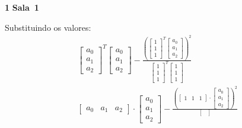 \documentclass{article}
\newcounter{exe-list}
\newenvironment{exe}[2][Sala]
    {\bigskip\noindent\par\ifthenelse{\equal{#1}{}}%
        {\textbf{\LARGE #2}}%
        {\textbf{\LARGE #1~#2}}%
    \medskip\noindent\par}
    {\bigskip}
\begin{document}
\begin{exe}{1}
    Substituindo os valores:
    \begin{align*}
        &\begin{bmatrix}
                a_0 \\ a_1 \\ a_2
            \end{bmatrix}^T \begin{bmatrix}
                a_0 \\ a_1 \\ a_2
            \end{bmatrix}
            - \frac{
                \left(\begin{bmatrix}
                    1 \\ 1 \\ 1
                \end{bmatrix}^T \begin{bmatrix}
                    a_0 \\ a_1 \\ a_2
                \end{bmatrix} \right)^2
            }{
                \begin{bmatrix}
                    1 \\ 1 \\ 1
                \end{bmatrix}^T \begin{bmatrix}
                    1 \\ 1 \\ 1
                \end{bmatrix}
            } \\
        &\begin{bmatrix}
                a_0 & a_1 & a_2
            \end{bmatrix} \cdot \begin{bmatrix}
                a_0 \\ a_1 \\ a_2
            \end{bmatrix}
            - \frac{
                \left(\begin{bmatrix}
                    1 & 1 & 1
                \end{bmatrix} \cdot \begin{bmatrix}
                    a_0 \\ a_1 \\ a_2
                \end{bmatrix} \right)^2
            }{
                \begin{bmatrix}

\end{bmatrix}}
\end{align*}
\end{exe}
\end{document}
